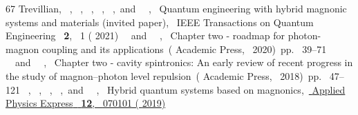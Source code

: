 \documentclass[
twocolumn,

superscriptaddress,









 amsmath,amssymb,
 aps,


prl,




]{revtex4-2}
\begin{document}
\begin{thebibliography}{67}
{{  {Trevillian}},  {\ },  {\ },  {~},  {~},  {~},\ and\  {\ },\ } { {Quantum engineering with hybrid magnonic systems and materials (invited paper)},\ }\href@noop {} { { {IEEE Transactions on Quantum Engineering}\ }\textbf { {2}},\  {1} ( {2021})}
  \BibitemOpen
   { {~}\ and\  {\ },\ } { {Chapter two - roadmap for photon-magnon coupling and its applications}\ }( {Academic Press},\  {2020})\ pp.\  {39--71}
  \BibitemOpen
   { {~}\ and\  {\ },\ } { {Chapter two - cavity spintronics: An early review of recent progress in the study of magnon–photon level repulsion}\ }( {Academic Press},\  {2018})\ pp.\  {47--121}
  \BibitemOpen
   { {~},  {~},  {~},  {~},\ and\  {~},\ } { {Hybrid quantum systems based on magnonics},\ }\href {https://doi.org/10.7567/1882-0786/ab248d} { { {Applied Physics Express}\ }\textbf { {12}},\  {070101} ( {2019})}

\end{thebibliography}
\end{document}
